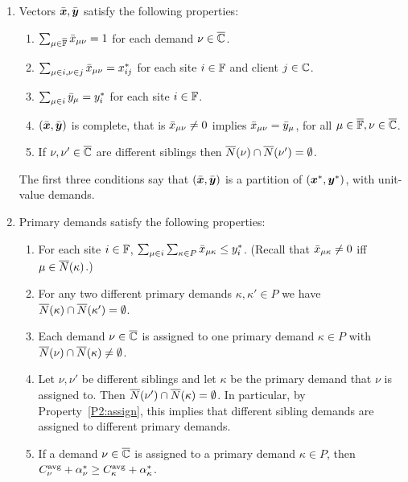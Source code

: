\documentclass[11pt]{article}
\begin{document}
\begin{enumerate}
      \renewcommand{\theenumi}{P\arabic{enumi}}
      \renewcommand{\labelenumi}{(\theenumi)}
      \renewcommand{\theenumii}{(\alph{enumii})}
      \renewcommand{\labelenumii}{\theenumii}

\item Vectors $\bar{\boldsymbol{x}},\bar{\boldsymbol{y}}$ satisfy the following properties:
%
  \begin{enumerate}
	\item \label{P1:one} 
          $\sum_{\mu\in\overline{\mathbb{F}}} {\bar x}_{\mu\nu} = 1$ for each demand $\nu\in\overline{\mathbb{C}}$. 
	\item \label{P1:xij} $\sum_{\mu\in i, \nu\in j} {\bar x}_{\mu\nu}
          = x^\ast_{ij}$ for each site $i\in\mathbb{F}$ and client $j\in\mathbb{C}$.
	\item \label{P1:yi}
          $\sum_{\mu\in i} {\bar y}_{\mu} = y^\ast_i$ for each site $i\in\mathbb{F}$.
	\item \label{P1:complete}
          $(\bar{\boldsymbol{x}},\bar{\boldsymbol{y}})$ is complete, that is ${\bar x}_{\mu\nu}\neq 0$ implies
				${\bar x}_{\mu\nu} = {\bar y}_{\mu}$, for all 
						$\mu\in\overline{\mathbb{F}}, \nu\in\overline{\mathbb{C}}$.
	\item \label{P1:siblings disjoint}
		 If $\nu,\nu'\in\overline{\mathbb{C}}$ are different siblings
			then ${\overline{N}}(\nu)\cap {\overline{N}}(\nu') = \emptyset$.
  \end{enumerate}
%
  The first three conditions say that $(\bar{\boldsymbol{x}},\bar{\boldsymbol{y}})$ is
  a partition of $(\boldsymbol{x}^\ast,\boldsymbol{y}^\ast)$, with unit-value
  demands. 

\item Primary demands satisfy the following properties:
%
\begin{enumerate}
%
\item \label{P2:yi} For each site $i\in\mathbb{F}$, $ \sum_{\mu\in i}\sum_{\kappa\in P}{\bar x}_{\mu\kappa} \leq y_i^\ast$.
	(Recall that ${\bar x}_{\mu\kappa}\neq 0$ iff $\mu\in {\overline{N}}(\kappa)$.)
%
	\item\label{P2:disjoint}  For any two different primary demands $\kappa,\kappa'\in P$ we have
	${\overline{N}}(\kappa)\cap {\overline{N}}(\kappa') = \emptyset$.
%
	\item \label{P2:assign} Each demand $\nu\in\overline{\mathbb{C}}$ is assigned
        to one primary demand $\kappa\in P$ with  ${\overline{N}}(\nu) \cap {\overline{N}}(\kappa) \neq \emptyset$.
%
      \item \label{P2:diff} 
Let $\nu,\nu'$ be different siblings and let $\kappa$ be the primary demand that $\nu$ is assigned to.
Then ${\overline{N}}(\nu')\cap {\overline{N}}(\kappa) = \emptyset$. In particular, by Property~\ref{P2:assign},
this implies that different sibling demands are assigned to different primary demands.
%
      \item \label{P2:cost} If a demand $\nu\in\overline{\mathbb{C}}$
        is assigned to a primary demand $\kappa\in P$, then
        $C^{{\mbox{\scriptsize\rm avg}}}_{\nu}+\alpha_{\nu}^\ast \geq
        C^{{\mbox{\scriptsize\rm avg}}}_{\kappa}+\alpha_{\kappa}^\ast$.
\end{enumerate}

\end{enumerate}
\end{document}
